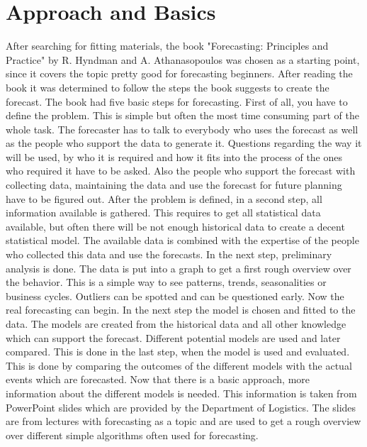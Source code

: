 \section{Approach and Basics}\label{section:Approach and Basics}
After searching for fitting materials, the book "Forecasting: Principles and Practice" by R. Hyndman and A. Athanasopoulos was chosen as a starting point, since it covers the topic pretty good for forecasting beginners. After reading the book it was determined to follow the steps the book suggests to create the forecast. The book had five basic steps for forecasting.\newline
First of all, you have to define the problem. This is simple but often the most time consuming part of the whole task. The forecaster has to talk to everybody who uses the forecast as well as the people who support the data to generate it. Questions regarding the way it will be used, by who it is required and how it fits into the process of the ones who required it have to be asked. Also the people who support the forecast with collecting data, maintaining the data and use the forecast for future planning have to be figured out. After the problem is defined, in a second step, all information available is gathered. This requires to get all statistical data available, but often there will be not enough historical data to create a decent statistical model. The available data is combined with the expertise of the people who collected this data and use the forecasts. In the next step, preliminary analysis is done. The data is put into a graph to get a first rough overview over the behavior. This is a simple way to see patterns, trends, seasonalities or business cycles. Outliers can be spotted and can be questioned early. Now the real forecasting can begin. In the next step the model is chosen and fitted to the data. The models are created from the historical data and all other knowledge which can support the forecast. Different potential models are used and later compared. This is done in the last step, when the model is used and evaluated. This is done by comparing the outcomes of the different models with the actual events which are forecasted.\newline
Now that there is a basic approach, more information about the different models is needed. This information is taken from PowerPoint slides which are provided by the Department of Logistics. The slides are from lectures with forecasting as a topic and are used to get a rough overview over different simple algorithms often used for forecasting.

